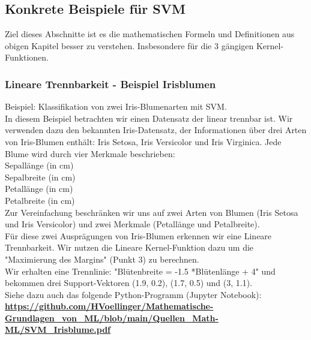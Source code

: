 \documentclass[12pt]{article}
\begin{document}
\subsection{Konkrete Beispiele für SVM}
%
Ziel dieses Abschnitte ist es die mathematischen Formeln und Definitionen  aus obigen Kapitel besser zu verstehen. Insbesondere für die 3 gängigen Kernel-Funktionen.

\subsubsection{Lineare Trennbarkeit - Beispiel Irisblumen}
%
Beispiel: Klassifikation von zwei Iris-Blumenarten mit SVM.\\
In diesem Beispiel betrachten wir einen Datensatz der linear trennbar ist. Wir verwenden dazu den bekannten Iris-Datensatz, der Informationen über drei Arten von Iris-Blumen enthält: Iris Setosa, Iris Versicolor und Iris Virginica. Jede Blume wird durch vier Merkmale beschrieben:\\
%
Sepallänge (in cm)\\
Sepalbreite (in cm)\\
Petallänge (in cm)\\
Petalbreite (in cm)\\[0.2cm]
%
Zur Vereinfachung beschränken wir uns auf zwei Arten von Blumen (Iris Setosa und Iris Versicolor) und zwei Merkmale (Petallänge und Petalbreite).\\
Für diese zwei Ausprägungen von Iris-Blumen erkennen wir eine Lineare Trennbarkeit. Wir nutzen die Lineare Kernel-Funktion dazu um die "Maximierung des Margins" (Punkt 3) zu berechnen.\\
Wir erhalten eine Trennlinie: "Blütenbreite = -1.5 *Blütenlänge + 4" und bekommen drei Support-Vektoren (1.9, 0.2), (1.7, 0.5) und (3, 1.1).\\[0.2cm]
Siehe dazu auch das folgende Python-Programm (Jupyter Notebook):\\
\textbf{\url{https://github.com/HVoellinger/Mathematische-Grundlagen_von_ML/blob/main/Quellen_Math-ML/SVM_Irisblume.pdf}} 
%
\end{document}
